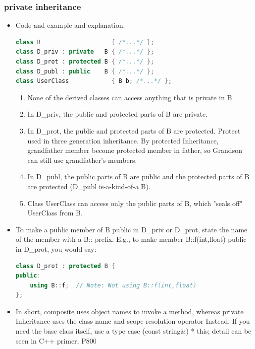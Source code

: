\documentclass[a4paper,11pt,twoside]{book}
\begin{document}
\subsubsection{private inheritance}
\begin{itemize}
	\item 	Code and example and explanation:
\begin{lstlisting}[frame=single, language=c++]
class B                    { /*...*/ };
class D_priv : private   B { /*...*/ };
class D_prot : protected B { /*...*/ };
class D_publ : public    B { /*...*/ };
class UserClass            { B b; /*...*/ };
\end{lstlisting}
	
	\begin{enumerate}
		\item None of the derived classes can access anything that is private in B.
		
		\item In D\_priv, the public and protected parts of B are private.
		
		\item In D\_prot, the public and protected parts of B are protected. Protect used in three generation inheritance. By protected Inheritance, grandfather member become protected member in father, so Grandson can still use grandfather's members.
		
		\item In D\_publ, the public parts of  B are public and the protected parts of B are protected (D\_publ is-a-kind-of-a B).
		
		\item Class UserClass can access only the public parts of B, which "seals off" UserClass from B.
	\end{enumerate}

	\item To make a public member of B public in D\_priv or D\_prot, state the name of the member with a B:: prefix. E.g., to make member B::f(int,float) public in D\_prot, you would say:
\begin{lstlisting}[frame=single, language=c++]
class D_prot : protected B {
public:
	using B::f;  // Note: Not using B::f(int,float)
};
\end{lstlisting}

\item In short, composite uses object names to invoke a method, whereas private Inheritance uses the class name and scope resolution operator Instead. If you need the base class itself, use a type case (const string\&) * this; detail can be seen in C++ primer, P800


\end{itemize}
\end{document}
